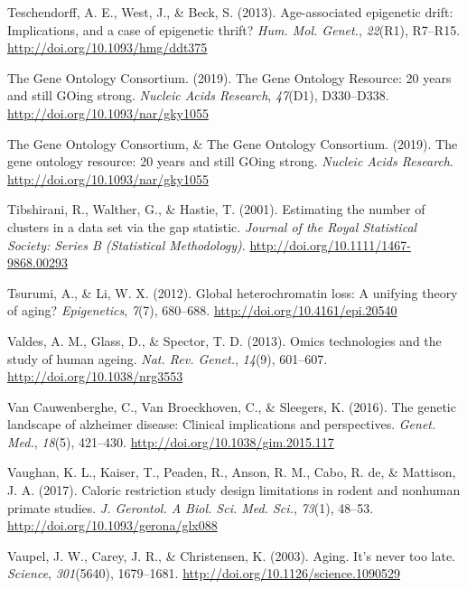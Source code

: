 \documentclass[12pt,twoside]{unicam}
\begin{document}
\begin{cslreferences}
\leavevmode\hypertarget{ref-Teschendorff2013}{}%
Teschendorff, A. E., West, J., \& Beck, S. (2013). Age-associated epigenetic drift: Implications, and a case of epigenetic thrift? \emph{Hum. Mol. Genet.}, \emph{22}(R1), R7--R15. \url{http://doi.org/10.1093/hmg/ddt375}

\leavevmode\hypertarget{ref-TheGeneOntologyConsortium2019}{}%
The Gene Ontology Consortium. (2019). The Gene Ontology Resource: 20 years and still GOing strong. \emph{Nucleic Acids Research}, \emph{47}(D1), D330--D338. \url{http://doi.org/10.1093/nar/gky1055}

\leavevmode\hypertarget{ref-The_Gene_Ontology_Consortium2019}{}%
The Gene Ontology Consortium, \& The Gene Ontology Consortium. (2019). The gene ontology resource: 20 years and still GOing strong. \emph{Nucleic Acids Research}. \url{http://doi.org/10.1093/nar/gky1055}

\leavevmode\hypertarget{ref-Tibshirani2001}{}%
Tibshirani, R., Walther, G., \& Hastie, T. (2001). Estimating the number of clusters in a data set via the gap statistic. \emph{Journal of the Royal Statistical Society: Series B (Statistical Methodology)}. \url{http://doi.org/10.1111/1467-9868.00293}

\leavevmode\hypertarget{ref-Tsurumi2012}{}%
Tsurumi, A., \& Li, W. X. (2012). Global heterochromatin loss: A unifying theory of aging? \emph{Epigenetics}, \emph{7}(7), 680--688. \url{http://doi.org/10.4161/epi.20540}

\leavevmode\hypertarget{ref-Valdes2013}{}%
Valdes, A. M., Glass, D., \& Spector, T. D. (2013). Omics technologies and the study of human ageing. \emph{Nat. Rev. Genet.}, \emph{14}(9), 601--607. \url{http://doi.org/10.1038/nrg3553}

\leavevmode\hypertarget{ref-VanCauwenberghe2016}{}%
Van Cauwenberghe, C., Van Broeckhoven, C., \& Sleegers, K. (2016). The genetic landscape of alzheimer disease: Clinical implications and perspectives. \emph{Genet. Med.}, \emph{18}(5), 421--430. \url{http://doi.org/10.1038/gim.2015.117}

\leavevmode\hypertarget{ref-Vaughan2017}{}%
Vaughan, K. L., Kaiser, T., Peaden, R., Anson, R. M., Cabo, R. de, \& Mattison, J. A. (2017). Caloric restriction study design limitations in rodent and nonhuman primate studies. \emph{J. Gerontol. A Biol. Sci. Med. Sci.}, \emph{73}(1), 48--53. \url{http://doi.org/10.1093/gerona/glx088}

\leavevmode\hypertarget{ref-Vaupel2003}{}%
Vaupel, J. W., Carey, J. R., \& Christensen, K. (2003). Aging. It's never too late. \emph{Science}, \emph{301}(5640), 1679--1681. \url{http://doi.org/10.1126/science.1090529}


\end{cslreferences}
\end{document}
